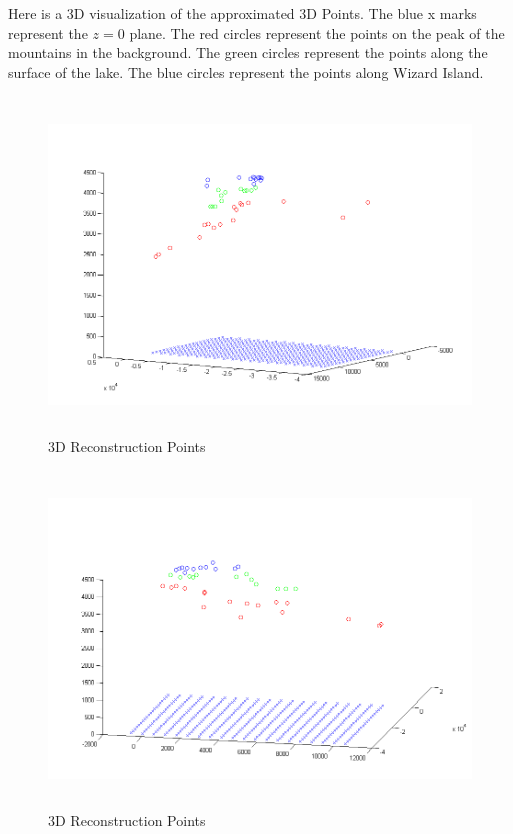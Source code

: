 \documentclass[11pt,psfig]{article}
\begin{document}
\newpage

Here is a 3D visualization of the approximated 3D Points. The blue x marks represent the $z=0$ plane. The red circles represent the points on the peak of the mountains in the background. The green circles represent the points along the surface of the lake. The blue circles represent the points along Wizard Island. 
\begin{figure}[H]
\centering
\includegraphics[height=3.5in]{sfmResults1/triangulationAttempt.png}
\caption{3D Reconstruction Points}
\end{figure}
\begin{figure}[H]
\centering
\includegraphics[height=3.5in]{sfmResults1/triangulationAttempt2.png}
\caption{3D Reconstruction Points}
\end{figure}
\end{document}
